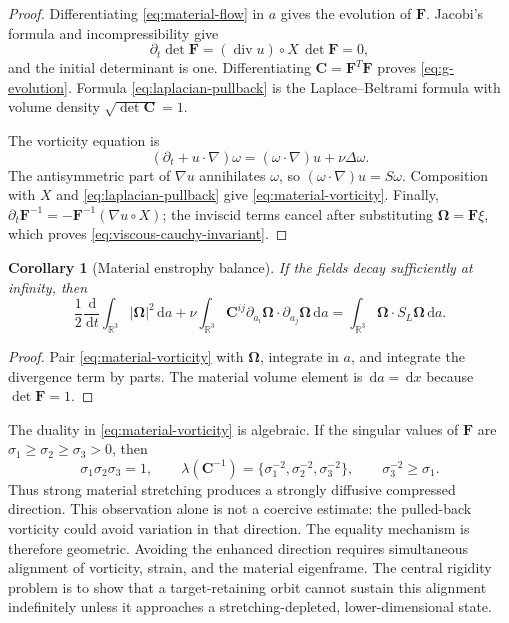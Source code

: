 \documentclass[11pt]{amsart}
\numberwithin{equation}{section}
\theoremstyle{plain}
\newtheorem{corollary}[corollary]{Corollary}
\theoremstyle{definition}
\theoremstyle{remark}
\newcommand{\R}{\mathbb R}
\newcommand{\dd}{\,\mathrm d}
\newcommand{\diver}{\operatorname{div}}
\newcommand{\MaterialF}{\mathbf F}
\newcommand{\MaterialMetric}{\mathbf C}
\newcommand{\MaterialVort}{\boldsymbol\Omega}
\begin{document}
\begin{proof}
Differentiating \eqref{eq:material-flow} in \(a\) gives the evolution of
\(\MaterialF\).  Jacobi's formula and incompressibility give
\[
 \partial_t\det\MaterialF
 = (\diver u)\circ X\,\det\MaterialF=0,
\]
and the initial determinant is one.  Differentiating
\(\MaterialMetric=\MaterialF^T\MaterialF\) proves
\eqref{eq:g-evolution}.  Formula \eqref{eq:laplacian-pullback} is the
Laplace--Beltrami formula with volume density
\(\sqrt{\det\MaterialMetric}=1\).

The vorticity equation is
\[
 (\partial_t+u\cdot\nabla)\omega
 = (\omega\cdot\nabla)u+\nu\Delta\omega.
\]
The antisymmetric part of \(\nabla u\) annihilates \(\omega\), so
\((\omega\cdot\nabla)u=S\omega\).  Composition with \(X\) and
\eqref{eq:laplacian-pullback} give \eqref{eq:material-vorticity}.
Finally,
\(\partial_t\MaterialF^{-1}=-\MaterialF^{-1}(\nabla u\circ X)\);
the inviscid terms cancel after substituting
\(\MaterialVort=\MaterialF\xi\), which proves
\eqref{eq:viscous-cauchy-invariant}.
\end{proof}

\begin{corollary}[Material enstrophy balance]
\label{cor:material-enstrophy}
If the fields decay sufficiently at infinity, then
\begin{equation}\label{eq:material-enstrophy-balance}
 \frac12\frac{\dd}{\dd t}\int_{\R^3}|\MaterialVort|^2\dd a
 +\nu\int_{\R^3}\MaterialMetric^{ij}
       \partial_{a_i}\MaterialVort\cdot
       \partial_{a_j}\MaterialVort\dd a
 =\int_{\R^3}\MaterialVort\cdot S_L\MaterialVort\dd a.
\end{equation}
\end{corollary}

\begin{proof}
Pair \eqref{eq:material-vorticity} with \(\MaterialVort\), integrate in
\(a\), and integrate the divergence term by parts.  The material volume
element is \(\dd a=\dd x\) because \(\det\MaterialF=1\).
\end{proof}

The duality in \eqref{eq:material-vorticity} is algebraic.  If the singular
values of \(\MaterialF\) are
\(\sigma_1\ge\sigma_2\ge\sigma_3>0\), then
\begin{equation}\label{eq:singular-value-duality}
 \sigma_1\sigma_2\sigma_3=1,
 \qquad
 \lambda(\MaterialMetric^{-1})=
 \{\sigma_1^{-2},\sigma_2^{-2},\sigma_3^{-2}\},
 \qquad
 \sigma_3^{-2}\ge\sigma_1.
\end{equation}
Thus strong material stretching produces a strongly diffusive compressed
direction.  This observation alone is not a coercive estimate: the pulled-back
vorticity could avoid variation in that direction.  The equality mechanism is
therefore geometric.  Avoiding the enhanced direction requires simultaneous
alignment of vorticity, strain, and the material eigenframe.  The central
rigidity problem is to show that a target-retaining orbit cannot sustain this
alignment indefinitely unless it approaches a stretching-depleted,
lower-dimensional state.
\end{document}

